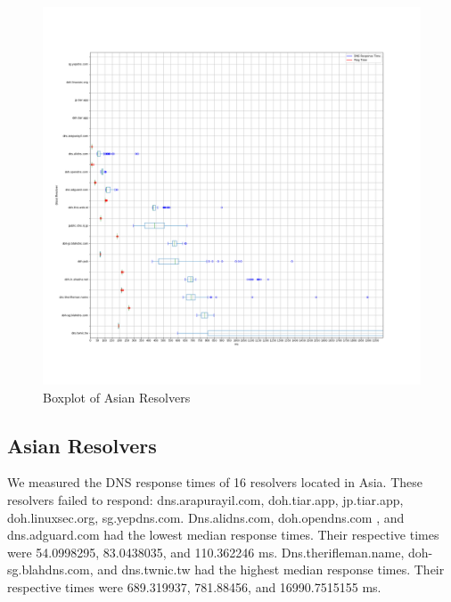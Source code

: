 \begin{figure}[!t]
    \includegraphics[width=\linewidth]{figures/100_Asia.png}
    \caption{Boxplot of Asian Resolvers}
    \label{fig:AsiaPlots}
\end{figure}

\subsection{Asian Resolvers}
We measured the DNS response times of 16 resolvers located in Asia. 
These resolvers failed to respond: dns.arapurayil.com, doh.tiar.app, jp.tiar.app, doh.linuxsec.org, sg.yepdns.com.
Dns.alidns.com, doh.opendns.com , and dns.adguard.com had the lowest median response times. 
Their respective times were 54.0998295, 83.0438035, and  110.362246 ms. 
Dns.therifleman.name, doh-sg.blahdns.com, and dns.twnic.tw had the highest median response times. 
Their respective times were 689.319937, 781.88456, and 16990.7515155 ms. 

